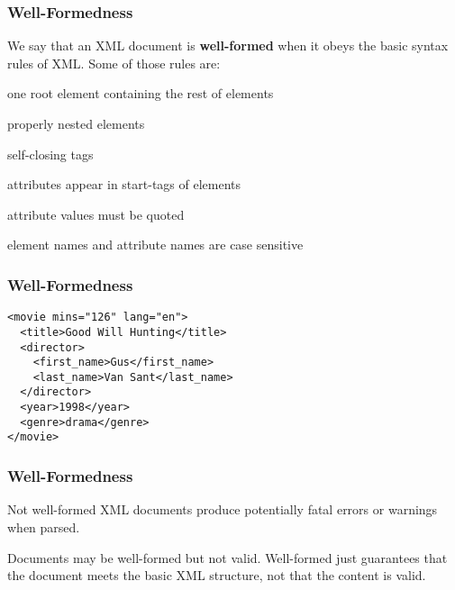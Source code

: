 \documentclass[12pt]{beamer}\usepackage[]{graphicx}\usepackage[]{color}
\begin{document}

\begin{frame}
\frametitle{}
\begin{center}
\end{center}
\end{frame}


\begin{frame}
\frametitle{}
\begin{center}
\end{center}
\end{frame}


\begin{frame}
\frametitle{Well-Formedness}

We say that an XML document is \textbf{well-formed} when it obeys the basic syntax rules of XML. Some of those rules are:
\bi
 \item one root element containing the rest of elements
 \item properly nested elements
 \item self-closing tags
 \item attributes appear in start-tags of elements
 \item attribute values must be quoted
 \item element names and attribute names are case sensitive
\ei
\eb

\end{frame}


\begin{frame}[fragile]
\frametitle{Well-Formedness}

\begin{verbatim}
<movie mins="126" lang="en">
  <title>Good Will Hunting</title>
  <director>
    <first_name>Gus</first_name>
    <last_name>Van Sant</last_name>
  </director>
  <year>1998</year>
  <genre>drama</genre>
</movie>
\end{verbatim}

\end{frame}


\begin{frame}
\frametitle{Well-Formedness}

Not well-formed XML documents produce potentially fatal errors or warnings when parsed.

\bigskip
Documents may be well-formed but not valid. Well-formed just guarantees that the document meets the basic XML structure, not that the content is valid.
\eb

\end{frame}
\end{document}
